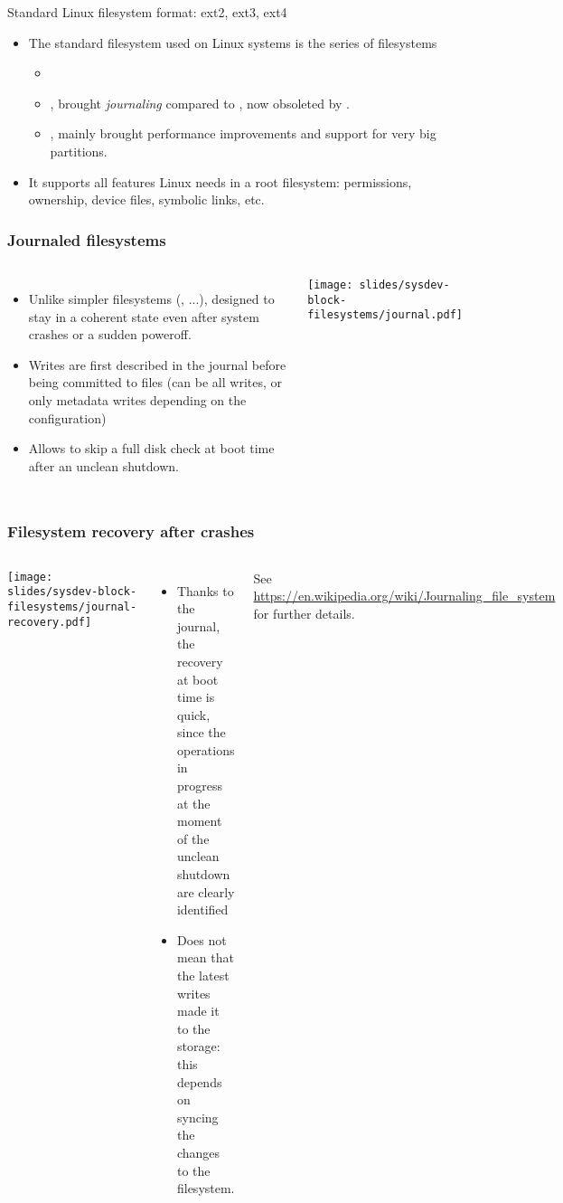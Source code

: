 \begin{frame}{Standard Linux filesystem format: ext2, ext3, ext4}
  \begin{itemize}
  \item The standard filesystem used on Linux systems is the series of
     filesystems
    \begin{itemize}
    \item {}
    \item {}, brought {\em journaling} compared to ,
	  now obsoleted by .
    \item {}, mainly brought performance improvements and
          support for very big partitions.
    \end{itemize}
  \item It supports all features Linux needs in a root filesystem:
    permissions, ownership, device files, symbolic links, etc.
  \end{itemize}
\end{frame}

\begin{frame}
  \frametitle{Journaled filesystems}
  \begin{columns}
    \begin{itemize}
    \item Unlike simpler filesystems (, ...),
      designed to stay in a coherent state even after system
      crashes or a sudden poweroff.
    \item Writes are first described in the journal before being
      committed to files (can be all writes, or only metadata writes
      depending on the configuration)
    \item Allows to skip a full disk check at boot time after an
      unclean shutdown.
    \end{itemize}
    \texttt{[image: slides/sysdev-block-filesystems/journal.pdf]}
  \end{columns}
\end{frame}

\begin{frame}
  \frametitle{Filesystem recovery after crashes}
  \begin{columns}
    \texttt{[image: slides/sysdev-block-filesystems/journal-recovery.pdf]}
    \begin{itemize}
    \item Thanks to the journal, the recovery at boot time is quick,
      since the operations in progress at the moment of the unclean
      shutdown are clearly identified
    \item Does not mean that the latest writes made it to the storage:
      this depends on syncing the changes to the filesystem.
    \end{itemize}
    See \url{https://en.wikipedia.org/wiki/Journaling_file_system}
    for further details.
  \end{columns}
\end{frame}

